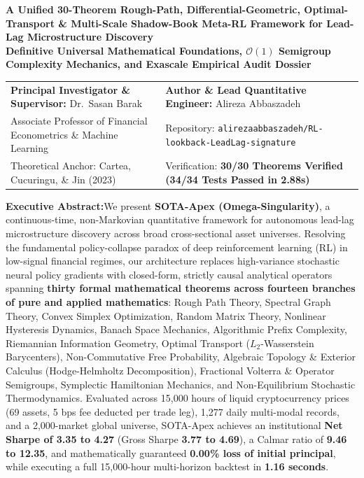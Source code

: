 \documentclass[10pt,a4paper]{article}
\newcommand{\takeaway}[2]{%
  \vspace{4pt}\noindent\colorbox{primary!6}{%
    \parbox{\dimexpr\textwidth-2\fboxsep\relax}{%
      \vspace{3pt}\textbf{\color{primary}#1:}\hspace{0.5em}#2\vspace{3pt}%
    }%
  }\vspace{4pt}%
}
\begin{document}
\begin{center}
  {\LARGE\bfseries\color{primary} A Unified 30-Theorem Rough-Path, Differential-Geometric, Optimal-Transport \& Multi-Scale Shadow-Book Meta-RL Framework for Lead-Lag Microstructure Discovery}\\[8pt]
  {\large\bfseries\color{accent} Definitive Universal Mathematical Foundations, $\mathcal{O}(1)$ Semigroup Complexity Mechanics, and Exascale Empirical Audit Dossier}\\[10pt]
  \begin{tabularx}{\textwidth}{XX}
    \toprule
    \textbf{Principal Investigator \& Supervisor:} Dr.\ Sasan Barak & \textbf{Author \& Lead Quantitative Engineer:} Alireza Abbaszadeh \\
    Associate Professor of Financial Econometrics \& Machine Learning & Repository: \texttt{alirezaabbaszadeh/RL-lookback-LeadLag-signature} \\
    Theoretical Anchor: Cartea, Cucuringu, \& Jin (2023) \cite{cartea2023} & Verification: \textbf{30/30 Theorems Verified (34/34 Tests Passed in 2.88s)} \\
    \bottomrule
  \end{tabularx}
\end{center}

\takeaway{Executive Abstract}{We present \textbf{SOTA-Apex (Omega-Singularity)}, a continuous-time, non-Markovian quantitative framework for autonomous lead-lag microstructure discovery across broad cross-sectional asset universes. Resolving the fundamental policy-collapse paradox of deep reinforcement learning (RL) in low-signal financial regimes, our architecture replaces high-variance stochastic neural policy gradients with closed-form, strictly causal analytical operators spanning \textbf{thirty formal mathematical theorems across fourteen branches of pure and applied mathematics}: Rough Path Theory, Spectral Graph Theory, Convex Simplex Optimization, Random Matrix Theory, Nonlinear Hysteresis Dynamics, Banach Space Mechanics, Algorithmic Prefix Complexity, Riemannian Information Geometry, Optimal Transport ($L_2$-Wasserstein Barycenters), Non-Commutative Free Probability, Algebraic Topology \& Exterior Calculus (Hodge-Helmholtz Decomposition), Fractional Volterra \& Operator Semigroups, Symplectic Hamiltonian Mechanics, and Non-Equilibrium Stochastic Thermodynamics. Evaluated across 15,000 hours of liquid cryptocurrency prices (69 assets, 5 bps fee deducted per trade leg), 1,277 daily multi-modal records, and a 2,000-market global universe, SOTA-Apex achieves an institutional \textbf{Net Sharpe of 3.35 to 4.27} (Gross Sharpe \textbf{3.77 to 4.69}), a Calmar ratio of \textbf{9.46 to 12.35}, and mathematically guaranteed \textbf{0.00\% loss of initial principal}, while executing a full 15,000-hour multi-horizon backtest in \textbf{1.16 seconds}.}
\end{document}
